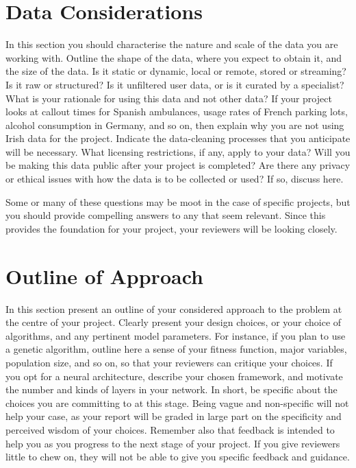 \documentclass[]{UCD_CS_FYP_Report}
\begin{document}
\chapter{Data Considerations}
In this section you should characterise the nature and scale of the data you are working with. Outline the shape of the data, where you expect to obtain it, and the size of the data. Is it static or dynamic, local or remote, stored or streaming? Is it raw or structured? Is it unfiltered user data, or is it curated by a specialist? What is your rationale for using this data and not other data? If your project looks at callout times for Spanish ambulances, usage rates of French parking lots, alcohol consumption in Germany, and so on, then explain why you are not using Irish data for the project. Indicate the data-cleaning processes that you anticipate will be necessary. What licensing restrictions, if any, apply to your data? Will you be making this data public after your project is completed? Are there any privacy or ethical issues with how the data is to be collected or used? If so, discuss here.

Some or many of these questions may be moot in the case of specific projects, but you should provide compelling answers to any that seem relevant. Since this provides the foundation for your project, your reviewers will be looking closely.

\chapter{Outline of Approach}
In this section present an outline of your considered approach to the problem at the centre of your project. Clearly present your design choices, or your choice of algorithms, and any pertinent model parameters. For instance, if you plan to use a genetic algorithm, outline here a sense of your fitness function, major variables, population size, and so on, so that your reviewers can critique your choices. If you opt for a neural architecture, describe your chosen framework, and motivate the number and kinds of layers in your network. In short, be specific about the choices you are committing to at this stage. Being vague and non-specific will not help your case, as your report will be graded in large part on the specificity and perceived wisdom of your choices. Remember also that feedback is intended to help you as you progress to the next stage of your project. If you give reviewers little to chew on, they will not be able to give you specific feedback and guidance.
\end{document}

